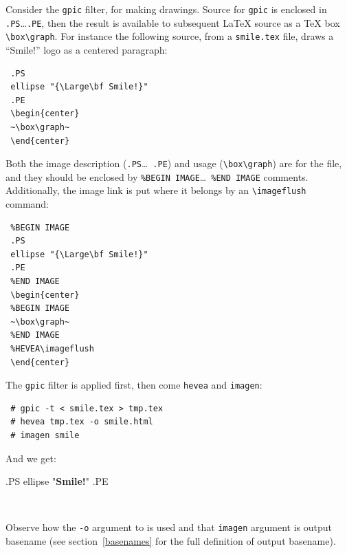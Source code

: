 Consider the \texttt{gpic} filter, for making drawings.
Source for \texttt{gpic} is enclosed in \verb+.PS+\ldots \verb+.PE+,
then the result is available to subsequent \LaTeX{} source as a \TeX{}
box \verb+\box\graph+.
For instance the following source, from a \texttt{smile.tex} file,
draws a ``Smile!'' logo as a centered
paragraph:
\begin{verbatim}
 .PS
 ellipse "{\Large\bf Smile!}"
 .PE
 \begin{center}
 ~\box\graph~
 \end{center}
\end{verbatim}
Both the image description (\verb+.PS+\ldots\ \verb+.PE+) and usage (\verb+\box\graph+)
are for the  file, and they should be
enclosed by \verb+%BEGIN IMAGE+\ldots\ \verb+%END IMAGE+ comments.
Additionally, the image link is put where it belongs by an
\verb+\imageflush+ command:
\begin{verbatim}
 %BEGIN IMAGE
 .PS
 ellipse "{\Large\bf Smile!}"
 .PE
 %END IMAGE
 \begin{center}
 %BEGIN IMAGE
 ~\box\graph~
 %END IMAGE
 %HEVEA\imageflush
 \end{center}
\end{verbatim}
The \texttt{gpic} filter is applied first, then come \texttt{hevea}
and \texttt{imagen}:
\begin{verbatim}
 # gpic -t < smile.tex > tmp.tex
 # hevea tmp.tex -o smile.html
 # imagen smile
\end{verbatim}
And we get:
\ifpdf
\begin{center}
\end{center}
\else
.PS
ellipse "{\Large\bf Smile!}"
.PE
\begin{center}
~\box\graph~
\end{center}
\fi
Observe how the \verb+-o+ argument to \hevea{} is used and that
\texttt{imagen} argument is \hevea{} output basename (see
section~\ref{basenames} for the full definition of \hevea{} output basename).


